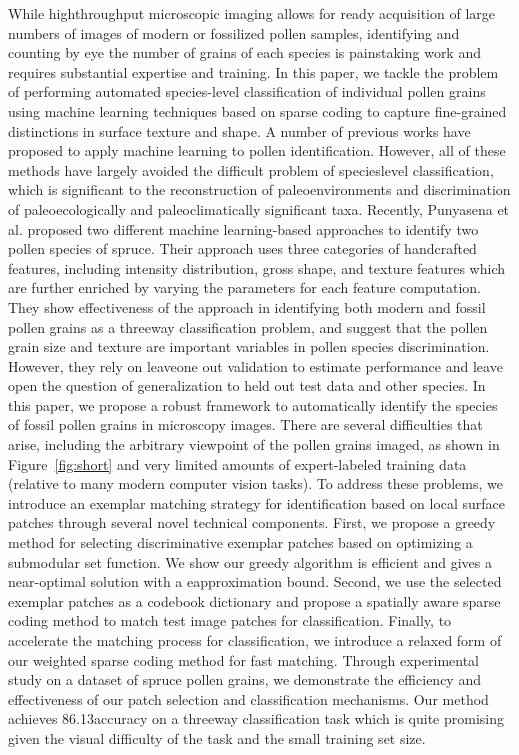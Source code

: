\documentclass[10pt,twocolumn,letterpaper]{article}
\begin{document}
While highthroughput microscopic imaging allows for ready acquisition of large numbers of images of modern or fossilized pollen samples, identifying and counting by eye the number of grains of each species is painstaking work and requires substantial expertise and training. In this paper, we tackle the problem of performing automated species-level classification of individual pollen grains using machine learning techniques based on sparse coding to capture fine-grained distinctions in surface texture and shape.
A number of previous works have proposed to apply machine learning to pollen identification. However, all of these methods have largely avoided the difficult problem of specieslevel classification, which is significant to the reconstruction of paleoenvironments and discrimination of paleoecologically and paleoclimatically significant taxa. Recently, Punyasena et al. proposed two different machine learning-based approaches to identify two pollen species of spruce. Their approach uses three categories of handcrafted features, including intensity distribution, gross shape, and texture features which are further enriched by varying the parameters for each feature computation. They show effectiveness of the approach in identifying both modern and fossil pollen grains as a threeway classification problem, and suggest that the pollen grain size and texture are important variables in pollen species discrimination. However, they rely on leaveone out validation to estimate performance and leave open the question of generalization to held out test data and other species.
In this paper, we propose a robust framework to automatically identify the species of fossil pollen grains in microscopy images. There are several difficulties that arise, including the arbitrary viewpoint of the pollen grains imaged, as shown in Figure~\ref{fig:short} and very limited amounts of expert-labeled training data (relative to many modern computer vision tasks). To address these problems, we introduce an exemplar matching strategy for identification based on local surface patches through several novel technical components. First, we propose a greedy method for selecting discriminative exemplar patches based on optimizing a submodular set function. We show our greedy algorithm is efficient and gives a near-optimal solution with a eapproximation bound. Second, we use the selected exemplar patches as a codebook dictionary and propose a spatially aware sparse coding method to match test image patches for classification. Finally, to accelerate the matching process for classification, we introduce a relaxed form of our weighted sparse coding method for fast matching. Through experimental study on a dataset of spruce pollen grains, we demonstrate the efficiency and effectiveness of our patch selection and classification mechanisms. Our method achieves 86.13accuracy on a threeway classification task which is quite promising given the visual difficulty of the task and the small training set size.
\end{document}
